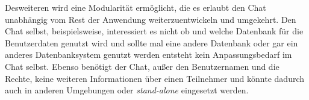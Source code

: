 Desweiteren wird eine Modularit\"at erm\"oglicht, die es erlaubt den Chat unabh\"angig vom
Rest der Anwendung weiterzuentwickeln und umgekehrt. Den Chat selbst, beispielsweise, interessiert es
nicht ob und welche Datenbank f\"ur die Benutzerdaten genutzt wird und sollte mal eine andere Datenbank
oder gar ein anderes Datenbanksystem genutzt werden entsteht kein Anpassungsbedarf im Chat selbst. Ebenso
ben\"otigt der Chat, au{\ss}er den Benutzernamen und die Rechte, keine weiteren Informationen \"uber einen
Teilnehmer und k\"onnte dadurch auch in anderen Umgebungen oder {\it stand-alone} eingesetzt werden.







